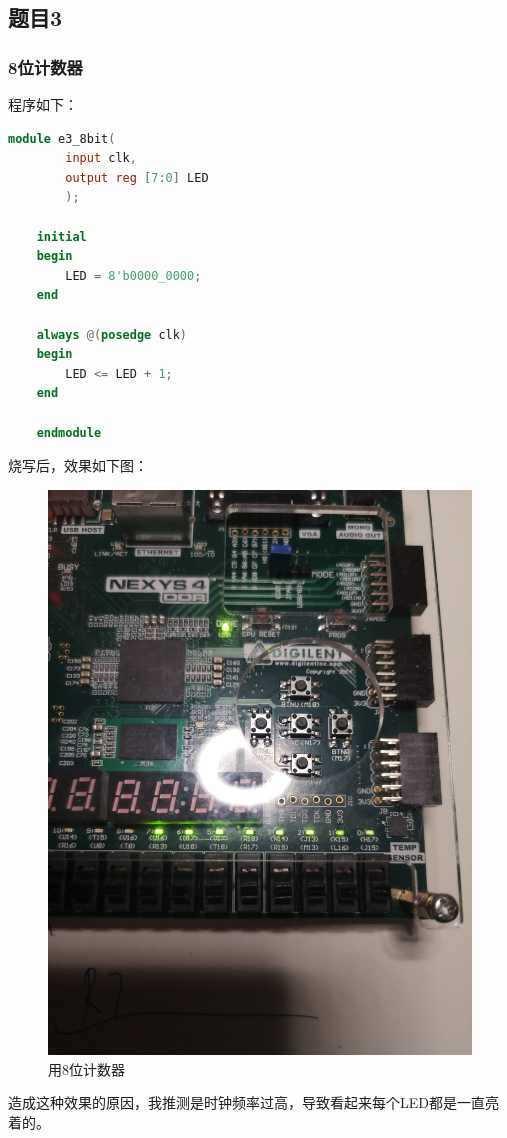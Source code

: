 \documentclass[UTF8]{article}
\begin{document}
	
	\subsection{题目3}
	\subsubsection{8位计数器}
	程序如下：\par
	\begin{lstlisting}[language=Verilog]
	module e3_8bit(
		input clk,
		output reg [7:0] LED
		);
	
	initial
	begin
		LED = 8'b0000_0000;
	end
	
	always @(posedge clk)
	begin
		LED <= LED + 1;
	end
	
	endmodule
	\end{lstlisting}
	烧写后，效果如下图：\par
	\begin{figure}[H]
		\centering
		\includegraphics[width=0.5\linewidth]{e3_1.jpg}
		\caption{用8位计数器}
		\label{e3_1}
	\end{figure}\par
	造成这种效果的原因，我推测是时钟频率过高，导致看起来每个LED都是一直亮着的。\par
	
\end{document}
